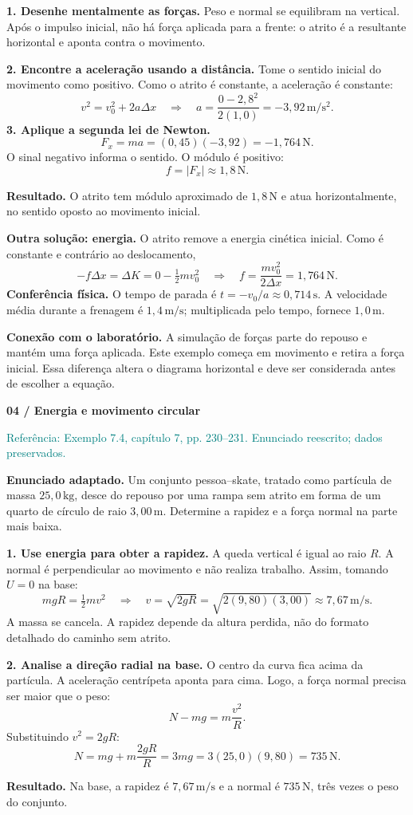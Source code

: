 \documentclass[11pt,a4paper]{article}
\newcommand{\result}[1]{\par\colorbox{pale}{\parbox{\dimexpr\linewidth-2\fboxsep}{\vspace{4pt}\textbf{Resultado.} #1\vspace{4pt}}}\par}
\newcommand{\source}[1]{{\small\textcolor{teal}{Referência: #1. Enunciado reescrito; dados preservados.}}\par}
\newcommand{\exercise}[2]{{\LARGE\bfseries\color{ink}#1}\par\vspace{3pt}{\large #2}\par\vspace{5pt}}
\begin{document}
\textbf{1. Desenhe mentalmente as forças.} Peso e normal se equilibram na vertical. Após o impulso inicial, não há força aplicada para a frente: o atrito é a resultante horizontal e aponta contra o movimento.

\textbf{2. Encontre a aceleração usando a distância.} Tome o sentido inicial do movimento como positivo. Como o atrito é constante, a aceleração é constante:
\[
v^2=v_0^2+2a\Delta x
\quad\Longrightarrow\quad
a=\frac{0-2{,}8^2}{2(1{,}0)}=-3{,}92\,\mathrm{m/s^2}.
\]
\textbf{3. Aplique a segunda lei de Newton.}
\[
F_x=ma=(0{,}45)(-3{,}92)=-1{,}764\,\mathrm N.
\]
O sinal negativo informa o sentido. O módulo é positivo:
\[
f=|F_x|\approx\boxed{1{,}8\,\mathrm N}.
\]
\result{O atrito tem módulo aproximado de $1{,}8\,\mathrm N$ e atua horizontalmente, no sentido oposto ao movimento inicial.}

\textbf{Outra solução: energia.} O atrito remove a energia cinética inicial. Como é constante e contrário ao deslocamento,
\[
-f\Delta x=\Delta K=0-\tfrac12mv_0^2
\quad\Longrightarrow\quad f=\frac{mv_0^2}{2\Delta x}=1{,}764\,\mathrm N.
\]
\textbf{Conferência física.} O tempo de parada é $t=-v_0/a\approx0{,}714\,\mathrm s$. A velocidade média durante a frenagem é $1{,}4\,\mathrm{m/s}$; multiplicada pelo tempo, fornece $1{,}0\,\mathrm m$.

\textbf{Conexão com o laboratório.} A simulação de forças parte do repouso e mantém uma força aplicada. Este exemplo começa em movimento e retira a força inicial. Essa diferença altera o diagrama horizontal e deve ser considerada antes de escolher a equação.

\newpage
\exercise{04 / Energia e movimento circular}{A força normal pode superar o peso}
\source{Exemplo 7.4, capítulo 7, pp. 230--231}
\textbf{Enunciado adaptado.} Um conjunto pessoa--skate, tratado como partícula de massa $25{,}0\,\mathrm{kg}$, desce do repouso por uma rampa sem atrito em forma de um quarto de círculo de raio $3{,}00\,\mathrm m$. Determine a rapidez e a força normal na parte mais baixa.

\textbf{1. Use energia para obter a rapidez.} A queda vertical é igual ao raio $R$. A normal é perpendicular ao movimento e não realiza trabalho. Assim, tomando $U=0$ na base:
\[
mgR=\tfrac12mv^2\quad\Longrightarrow\quad
v=\sqrt{2gR}=\sqrt{2(9{,}80)(3{,}00)}\approx\boxed{7{,}67\,\mathrm{m/s}}.
\]
A massa se cancela. A rapidez depende da altura perdida, não do formato detalhado do caminho sem atrito.

\textbf{2. Analise a direção radial na base.} O centro da curva fica acima da partícula. A aceleração centrípeta aponta para cima. Logo, a força normal precisa ser maior que o peso:
\[
N-mg=m\frac{v^2}{R}.
\]
Substituindo $v^2=2gR$:
\[
N=mg+m\frac{2gR}{R}=3mg=3(25{,}0)(9{,}80)=\boxed{735\,\mathrm N}.
\]
\result{Na base, a rapidez é $7{,}67\,\mathrm{m/s}$ e a normal é $735\,\mathrm N$, três vezes o peso do conjunto.}
\end{document}

